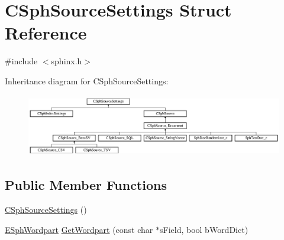 \hypertarget{structCSphSourceSettings}{\section{C\-Sph\-Source\-Settings Struct Reference}
\label{structCSphSourceSettings}
}


{\ttfamily \#include $<$sphinx.\-h$>$}

Inheritance diagram for C\-Sph\-Source\-Settings\-:\begin{figure}[H]
\begin{center}
\leavevmode
\includegraphics[height=2.745098cm]{structCSphSourceSettings}
\end{center}
\end{figure}
\subsection*{Public Member Functions}
\begin{DoxyCompactItemize}
\item 
\hyperlink{structCSphSourceSettings_acf0bb80a56d979e79019c3334ff8d69a}{C\-Sph\-Source\-Settings} ()
\item 
\hyperlink{sphinx_8h_a7a49c09fe68a444e69a19f051bf9b04f}{E\-Sph\-Wordpart} \hyperlink{structCSphSourceSettings_af0f3bdbd8ede501dcf056845558d2069}{Get\-Wordpart} (const char $\ast$s\-Field, bool b\-Word\-Dict)
\end{DoxyCompactItemize}
